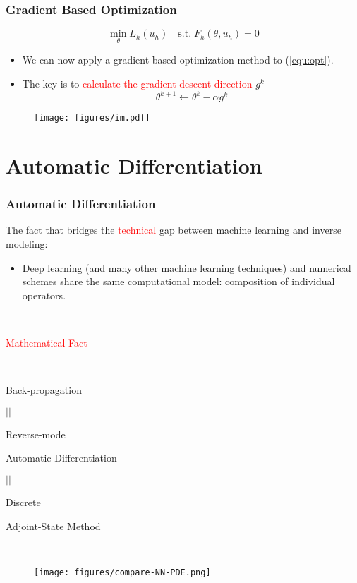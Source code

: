 \documentclass[usenames,dvipsnames]{beamer}
\begin{document}
\begin{frame}
	\frametitle{Gradient Based Optimization}
	\begin{equation}\label{equ:opt}
		\min_{\theta} L_h(u_h) \quad \mathrm{s.t.}\; F_h(\theta, u_h) = 0
		\end{equation}
	
	\begin{itemize}
		\item We can now apply a gradient-based optimization method to (\ref{equ:opt}).
		\item The key is to \textcolor{red}{calculate the gradient descent direction} $g^k$
		$$\theta^{k+1} \gets \theta^k - \alpha g^k$$ 
	\end{itemize}
	
	\begin{figure}[hbt]
	\centering
  \texttt{[image: figures/im.pdf]}
\end{figure}

\end{frame}



\section{Automatic Differentiation}

\begin{frame}
	\frametitle{Automatic Differentiation}
The fact that bridges the \textcolor{red}{technical} gap between machine learning and inverse modeling:
	\begin{itemize}
		\item Deep learning (and many other machine learning techniques) and numerical schemes share the same computational model: composition of individual operators. 
	\end{itemize}
	

\begin{minipage}[t]{0.4\textwidth}

\



\begin{center}
			\textcolor{red}{Mathematical Fact}

			\
			
	Back-propagation 

$||$

Reverse-mode

 Automatic Differentiation 

$||$
 
 Discrete 
 
 Adjoint-State Method
\end{center}
\end{minipage}~
\begin{minipage}[t]{0.6\textwidth}
\begin{figure}[hbt]
  \texttt{[image: figures/compare-NN-PDE.png]}
\end{figure}
\end{minipage}

\end{frame}
\end{document}
